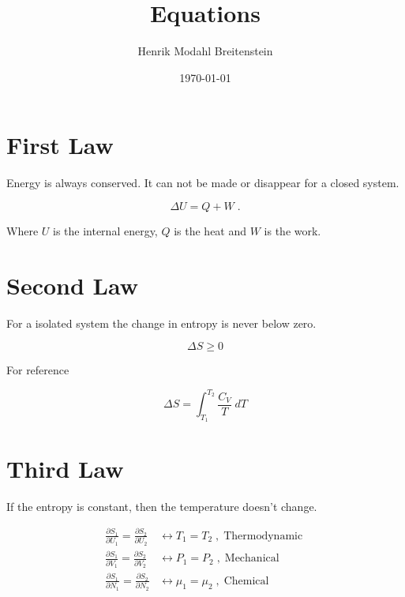 \documentclass[reprint,english,notitlepage]{revtex4-1}  %
\begin{document}
\title{Equations}   %
\author{Henrik Modahl Breitenstein}               %
\date{\today}                             %
\noaffiliation                            %
\maketitle

\section*{First Law}

Energy is always conserved. It can not be made or disappear for a closed system.

\begin{equation}
\label{first}
\Delta{U} = Q + W \; .
\end{equation}

Where $U$ is the internal energy, $Q$ is the heat and $W$ is the work.

\section*{Second Law}

For a isolated system the change in entropy is never below zero.

\begin{equation}
\label{second}
\Delta{S} \geq 0
\end{equation}

For reference

\begin{equation}\label{ent}
\Delta{S} = \int_{T_1}^{T_2} \frac{C_V}{T} \; dT
\end{equation}
\section*{Third Law}

If the entropy is constant, then the temperature doesn't change.

\begin{align*}
\label{third law}
\frac{\partial S_1}{\partial U_1} = \frac{\partial S_2}{\partial U_2} &\leftrightarrow T_1 = T_2 \; , \; \text{Thermodynamic} \;  \\
\frac{\partial S_1}{\partial V_1} = \frac{\partial S_2}{\partial V_2} &\leftrightarrow P_1 = P_2 \; , \; \text{Mechanical} \\
\frac{\partial S_1}{\partial N_1} = \frac{\partial S_2}{\partial N_2} &\leftrightarrow \mu_1 = \mu_2 \; , \; \text{Chemical}
\end{align*}
\end{document}
